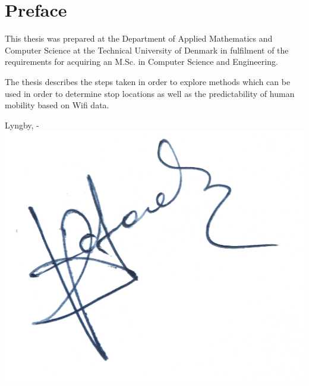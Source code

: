 \chapter{Preface}

This thesis was prepared at the Department of Applied Mathematics and Computer
Science at the Technical University of Denmark in fulfilment of the requirements
for acquiring an M.Sc. in Computer Science and Engineering.

The thesis describes the steps taken in order to explore methods which can be
used in order to determine stop locations as well as the predictability of human
mobility based on Wifi data.

\vspace{20mm}
\begin{center}
    \hspace{20mm} Lyngby, \thesishandin-\thesisyear
    \vspace{5mm}
    \newline
    \includegraphics[scale=0.03]{figures/Signature.jpg}
\end{center}
\begin{flushright}
    \thesisauthor
\end{flushright}
